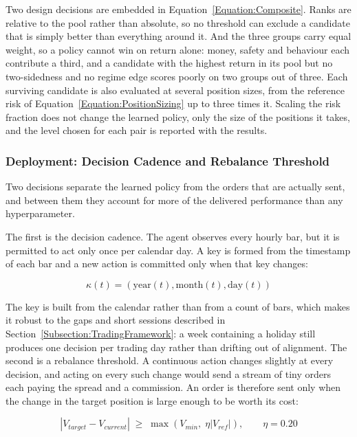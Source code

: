 

Two design decisions are embedded in Equation~\ref{Equation:Composite}. Ranks are relative to the pool rather than absolute, so no threshold can exclude a candidate that is simply better than everything around it. And the three groups carry equal weight, so a policy cannot win on return alone: money, safety and behaviour each contribute a third, and a candidate with the highest return in its pool but no two-sidedness and no regime edge scores poorly on two groups out of three. Each surviving candidate is also evaluated at several position sizes, from the reference risk of Equation~\ref{Equation:PositionSizing} up to three times it. Scaling the risk fraction does not change the learned policy, only the size of the positions it takes, and the level chosen for each pair is reported with the results.

\subsubsection{Deployment: Decision Cadence and Rebalance Threshold}

Two decisions separate the learned policy from the orders that are actually sent, and between them they account for more of the delivered performance than any hyperparameter.

The first is the decision cadence. The agent observes every hourly bar, but it is permitted to act only once per calendar day. A key is formed from the timestamp of each bar and a new action is committed only when that key changes:

\begin{equation}
\kappa(t) = (\text{year}(t), \text{month}(t), \text{day}(t))
\label{Equation:DecisionKey}
\end{equation}

The key is built from the calendar rather than from a count of bars, which makes it robust to the gaps and short sessions described in Section~\ref{Subsection:TradingFramework}: a week containing a holiday still produces one decision per trading day rather than drifting out of alignment. The second is a rebalance threshold. A continuous action changes slightly at every decision, and acting on every such change would send a stream of tiny orders each paying the spread and a commission. An order is therefore sent only when the change in the target position is large enough to be worth its cost:

\begin{equation}
\left| V_{target} - V_{current} \right| \;\geq\; \max\!\left(V_{min},\; \eta \left| V_{ref} \right|\right), \qquad \eta = 0.20
\label{Equation:Hysteresis}
\end{equation}

